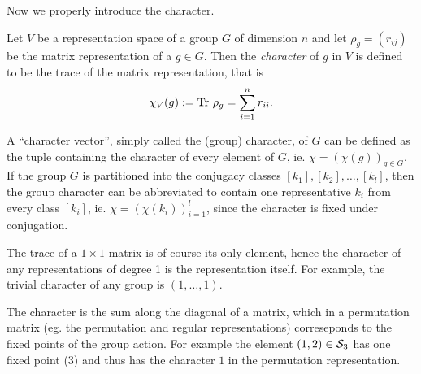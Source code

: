 Now we properly introduce the character.

\begin{definition}\label{def:char}
	Let $V$ be a representation space of a group $G$ of dimension $n$ and let $\rho_g = (r_{ij})$ be the matrix representation of a $g \in G$. Then the \emph{character} of $g$ in $V$ is defined to be the trace of the matrix representation, that is 
	\begin{align*}
		\chi_V(g) := \text{Tr } \rho_g = \sum_{i=1}^{n} r_{ii}.
	\end{align*}
\end{definition}


\begin{notation}
	A ``character vector'', simply called the (group) character, of $G$ can be defined as the tuple containing the character of every element of $G$, ie. $\chi = (\chi(g))_{g \in G}$. If the group $G$ is partitioned into the conjugacy classes $[k_1], [k_2], \dots, [k_l]$, then the group character can be abbreviated to contain one representative $k_i$ from every class $[k_i]$, ie. $\chi= (\chi(k_i))_{i=1}^l$, since the character is fixed under conjugation.%
\end{notation}

\begin{example}
	The  trace of a $1 \times 1$ matrix is of course its only element, hence the character of any representations of degree 1 is the representation itself.
	For example, the trivial character of any group is $(1, \dots, 1)$. 
\end{example}

\begin{example}\label{example:charperm}
	The character is the sum along the diagonal of a matrix, which in a permutation matrix (eg. the permutation and regular representations) correseponds to the fixed points of the group action. For example the element $(1,2) \in \mathcal{S}_3$ has one fixed point ($3$) and thus has the character $1$ in the permutation representation. 
\end{example}

